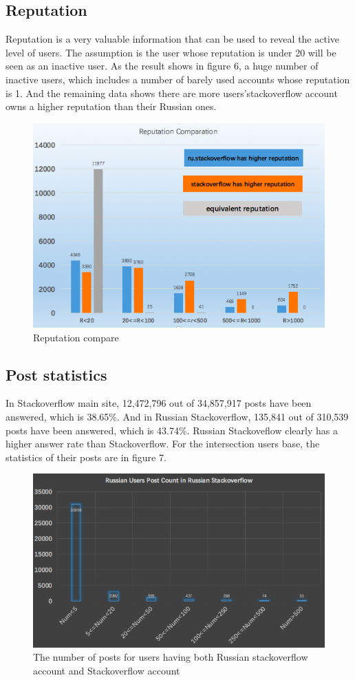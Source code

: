 \documentclass{article}
\begin{document}
\subsection{Reputation}
Reputation is a very valuable information that can be used to reveal the active level of users. The assumption is the user whose reputation is under 20 will be seen as an inactive user. As the result shows in figure 6, a huge number of inactive users, which includes a number of barely used accounts whose reputation is 1. And the remaining data shows there are more users’stackoverflow account owns a higher reputation than their Russian ones.
	\begin{figure}[H]
		\includegraphics[width = 1.0\textwidth]{user3.png}
		\caption{Reputation compare}
  	\end{figure}
  	
\subsection{Post statistics}
In Stackoverflow main site, 12,472,796 out of 34,857,917 posts have been answered, which is 38.65\%. And in Russian Stackoverflow, 135,841 out of 310,539 posts have been answered, which is 43.74\%. Russian Stackoveflow clearly has a higher answer rate than Stackoverflow. For the intersection users base, the statistics of their posts are in figure 7.
	\begin{figure}[H]
		\includegraphics[width = 1.0\textwidth]{user4.png}
		\caption{The number of posts for users having both Russian stackoverflow account and Stackoverflow account}
  	\end{figure}
\end{document}
